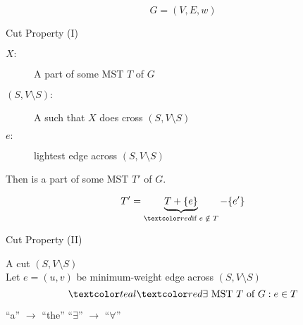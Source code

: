 
\begin{frame}{}
  \centerline{}

  \[
    G = (V, E, w)
  \]
\end{frame}

\begin{frame}{}
  \begin{exampleblock}{Cut Property (I)}
    \begin{description}
      \item[$X:$] A part of some MST $T$ of $G$
      \item[$(S, V \setminus S):$] A  such that $X$ does  cross $(S, V \setminus S)$
    ­ \item[$e:$]  lightest edge across $(S, V \setminus S)$
    \end{description}

    \pause
    \vspace{0.30cm}
    \centerline{Then  is a part of some MST $T'$ of $G$.}
  \end{exampleblock}

  \pause
  \vspace{0.60cm}
  \centerline{}
\end{frame}

\begin{frame}{}
  \centerline{}

  \pause
  \vspace{0.30cm}

  \pause
  \[
    T' = \underbrace{T + \set{e}}_{\red{\text{if } e \;\notin\; T}} - \set{e'}
  \]
\end{frame}

\begin{frame}{}
  \begin{exampleblock}{Cut Property (II)}
    \begin{center}
      A cut $(S, V \setminus S)$ \\[6pt]
      Let $e = (u,v)$ be  minimum-weight edge across $(S, V \setminus S)$ \pause
      \[
	\teal{\red{\exists} \text{ MST $T$ of } G: e \in T}
      \]
    \end{center}
  \end{exampleblock}

  \pause

  \pause
  \centerline{``a'' $\to$ ``the'' \red{$\implies$} ``$\exists$'' $\to$ ``$\forall$''}
\end{frame}

